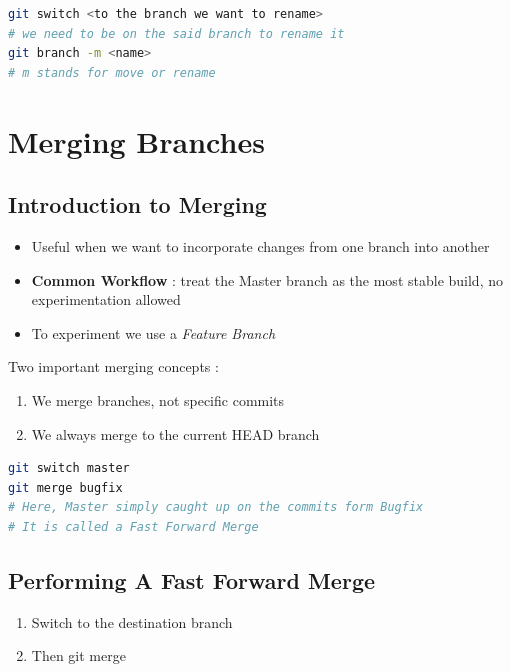 \documentclass{report}
\begin{document}
\begin{tcolorbox}[title=Rename Branches,colback=backcolour]
\begin{lstlisting}[language=bash]
git switch <to the branch we want to rename>
# we need to be on the said branch to rename it
git branch -m <name>
# m stands for move or rename
\end{lstlisting}
\end{tcolorbox}



\chapter{Merging Branches}


\section{Introduction to Merging}

\begin{itemize}
	\item Useful when we want to incorporate changes from one branch into another 
	\item \textbf{Common Workflow} : treat the Master branch as the most stable build, no experimentation allowed 
	\item To experiment we use a \textit{Feature Branch} 
\end{itemize}
Two important merging concepts :
\begin{enumerate}
	\item We merge branches, not specific commits 
	\item We always merge to the current HEAD branch
\end{enumerate}

\begin{tcolorbox}[title=Example,colback=backcolour]
\begin{lstlisting}[language=bash]
git switch master
git merge bugfix
# Here, Master simply caught up on the commits form Bugfix
# It is called a Fast Forward Merge
\end{lstlisting}
\end{tcolorbox}


\section{Performing A Fast Forward Merge}
\begin{enumerate}
	\item Switch to the destination branch 
	\item Then git merge
\end{enumerate}
\end{document}
